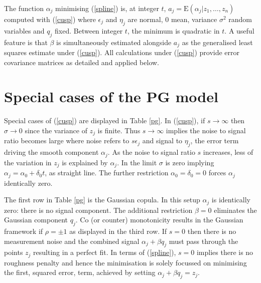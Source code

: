 \documentclass[authoryear]{elsarticle}
\newcommand{\E}{\mathrm{E}}
\newcommand{\eps}{\epsilon}
\newcommand{\eref}[1]{(\ref{#1})}
\newcommand{\tref}[1]{Table \ref{#1}}
\begin{document}
The  function $\alpha_j$ minimising \eref{spline}  is, at integer $t$,  $a_j=\E(\alpha_j|z_1,\ldots,z_n)$  computed with \eref{cusp} where $\eps_j$ and $\eta_j$ are normal, 0 mean, variance $\sigma^2$ random variables and $q_j$ fixed.  Between integer $t$,  the  minimum is quadratic in $t$.  A useful feature is that $\beta$ is simultaneously estimated alongside $a_j$ as the generalised least squares estimate under \eref{cusp}.  All calculations under \eref{cusp} provide error covariance matrices as detailed and applied below.  

\section{Special cases of the PG model}  

Special cases of  \eref{cusp}  are displayed in \tref{pg}.   In \eref{cusp}, if $s\rightarrow\infty$ then $\sigma\rightarrow 0$   since the variance of $z_j$ is finite.    Thus $s\rightarrow\infty$  implies the noise to signal ratio becomes large where noise refers to   $s\eps_j$ and signal to $\eta_j$, the error term driving  the smooth component $\alpha_j$.   As the noise to signal ratio $s$ increases, less of the variation in $z_j$ is explained by $\alpha_j$.  In the limit $\sigma$ is zero implying $\alpha_j=\alpha_0+\delta_0 t$, as straight line.   The further restriction $\alpha_0=\delta_0=0$ forces $\alpha_j$ identically zero.



The first row in \tref{pg} is the  Gaussian copula.  In this setup $\alpha_j$ is identically zero: there is no  signal component.  The additional restriction $\beta=0$ eliminates the Gaussian component $q_j$.  Co (or counter) monotonicity results in the Gaussian framework if $\rho=\pm 1$ as displayed in the third row.
If $s= 0$ then there is no measurement noise and the combined signal $\alpha_j+\beta q_j$ must pass through the points $z_j$ resulting in a perfect fit.   In terms of \eref{spline}, $s=0$ implies there is no roughness penalty and hence the minimisation is solely focussed on minimising the first, squared error, term, achieved  by setting $\alpha_j+\beta q_j=z_j$. 
 
\end{document}
